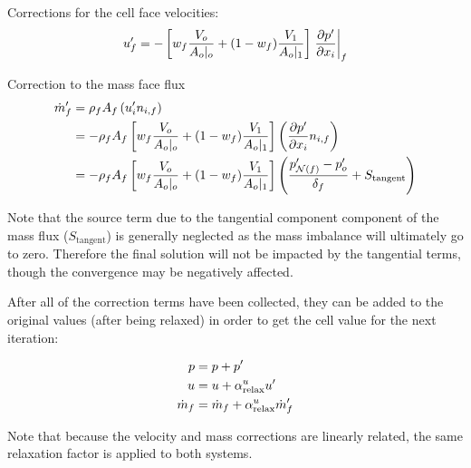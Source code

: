 Corrections for the cell face velocities:
\begin{equation}
u_f' = - \left[ w_f \frac{V_o}{A_o\rvert_o} + (1-w_f) \frac{V_1}{A_o\rvert_1} \right] \left. \pdv{p'}{x_i} \right|_f
\end{equation}

Correction to the mass face flux
\begin{align}
\mdotf' &= \rho_f A_f  \left( u_i' n_{i,f} \right) \\
%
&= - \rho_f A_f \left[ w_f \frac{V_o}{A_o\rvert_o} + (1-w_f) \frac{V_1}{A_o\rvert_1} \right] \left( \pdv{p'}{x_i} n_{i,f} \right) \\
%
&= - \rho_f A_f \left[ w_f \frac{V_o}{A_o\rvert_o} + (1-w_f) \frac{V_1}{A_o\rvert_1} \right] \left( \frac{p_{\Nb(f)}' - p_o'}{\delta_f} + S_{\text{tangent}} \right) 
\end{align}

Note that the source term due to the tangential component component of the mass flux ($S_{\text{tangent}}$) is generally neglected as the mass imbalance will ultimately go to zero. Therefore the final solution will not be impacted by the tangential terms, though the convergence may be negatively affected. 

After all of the correction terms have been collected, they can be added to the original values (after being relaxed) in order to get the cell value for the next iteration:

\begin{align}
p &= p + p' \\
u &= u + \alpha^u_{\mathrm{relax}} u' \\
\dot{m}_f &= \dot{m}_f + \alpha^u_{\mathrm{relax}} \dot{m}_f'
\end{align}

Note that because the velocity and mass corrections are linearly related, the same relaxation factor is applied to both systems. 

